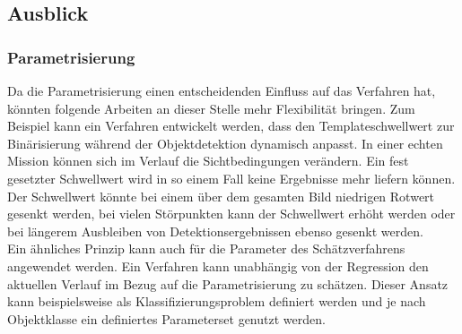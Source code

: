 \subsection{Ausblick}

\subsubsection{Parametrisierung}
Da die Parametrisierung einen entscheidenden Einfluss auf das Verfahren hat, könnten folgende Arbeiten an dieser Stelle mehr Flexibilität bringen. Zum Beispiel kann ein Verfahren entwickelt werden, dass den Templateschwellwert zur Binärisierung während der Objektdetektion dynamisch anpasst. In einer echten Mission können sich im Verlauf die Sichtbedingungen verändern. Ein fest gesetzter Schwellwert wird in so einem Fall keine Ergebnisse mehr liefern können. Der Schwellwert könnte bei einem über dem gesamten Bild niedrigen Rotwert gesenkt werden, bei vielen Störpunkten kann der Schwellwert erhöht werden oder bei längerem Ausbleiben von Detektionsergebnissen ebenso gesenkt werden.\\

Ein ähnliches Prinzip kann auch für die Parameter des Schätzverfahrens angewendet werden. Ein Verfahren kann unabhängig von der Regression den aktuellen Verlauf im Bezug auf die Parametrisierung zu schätzen. Dieser Ansatz kann beispielsweise als Klassifizierungsproblem definiert werden und je nach Objektklasse ein definiertes Parameterset genutzt werden.

